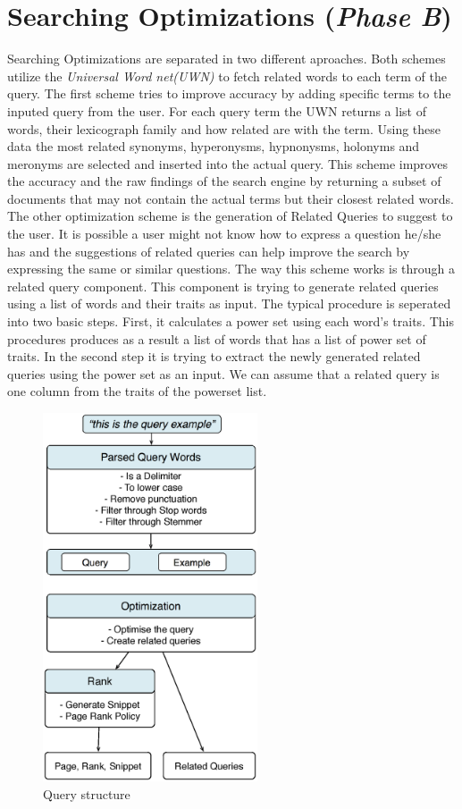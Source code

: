 \documentclass[letterpaper,10pt]{article}
\begin{document}
\section{Searching Optimizations (\emph{Phase B})}
Searching Optimizations are separated in two different aproaches. Both schemes utilize the \emph{Universal Word net(UWN)} to fetch related words to each term of the query. The first scheme tries to improve accuracy by adding specific terms to the inputed query from the user. For each query term the UWN returns a list of words, their lexicograph family and how related are with the term. Using these data the most related synonyms, hyperonysms, hypnonysms, holonyms and meronyms are selected and inserted into the actual query. This scheme improves the accuracy and the raw findings of the search engine by returning a subset of documents that may not contain the actual terms but their closest related words. The other optimization scheme is the generation of Related Queries to suggest to the user. It is possible a user might not know how to express a question he/she has and the suggestions of related queries can help improve the search by expressing the same or similar questions. The way this scheme works is through a related query component. This component is trying to generate related queries using a list of words and their traits as input. The typical procedure is seperated into two basic steps. First, it calculates a power set using each word's traits. This procedures produces as a result a list of words that has a list of power set of traits. In the second step it is trying to extract the newly generated related queries using the power set as an input. We can assume that a related query is one column from the traits of the powerset list.

\begin{figure}[H]
    \centering
    \includegraphics[width=2.5in]{Query.eps}
    \caption{Query structure}
    \label{Query structure}
\end{figure}
\end{document}
